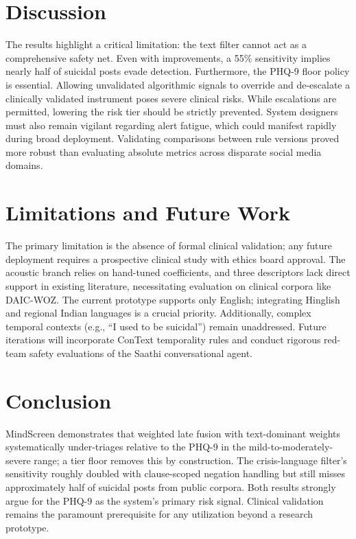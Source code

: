 \documentclass[conference]{IEEEtran}
\begin{document}
\section{Discussion}
The results highlight a critical limitation: the text filter cannot act as a comprehensive safety net. Even with improvements, a 55\% sensitivity implies nearly half of suicidal posts evade detection. Furthermore, the PHQ-9 floor policy is essential. Allowing unvalidated algorithmic signals to override and de-escalate a clinically validated instrument poses severe clinical risks. While escalations are permitted, lowering the risk tier should be strictly prevented. System designers must also remain vigilant regarding alert fatigue, which could manifest rapidly during broad deployment. Validating comparisons between rule versions proved more robust than evaluating absolute metrics across disparate social media domains.

\section{Limitations and Future Work}
The primary limitation is the absence of formal clinical validation; any future deployment requires a prospective clinical study with ethics board approval. The acoustic branch relies on hand-tuned coefficients, and three descriptors lack direct support in existing literature, necessitating evaluation on clinical corpora like DAIC-WOZ. The current prototype supports only English; integrating Hinglish and regional Indian languages is a crucial priority. Additionally, complex temporal contexts (e.g., ``I used to be suicidal'') remain unaddressed. Future iterations will incorporate ConText temporality rules and conduct rigorous red-team safety evaluations of the Saathi conversational agent.

\section{Conclusion}
MindScreen demonstrates that weighted late fusion with text-dominant weights systematically under-triages relative to the PHQ-9 in the mild-to-moderately-severe range; a tier floor removes this by construction. The crisis-language filter's sensitivity roughly doubled with clause-scoped negation handling but still misses approximately half of suicidal posts from public corpora. Both results strongly argue for the PHQ-9 as the system's primary risk signal. Clinical validation remains the paramount prerequisite for any utilization beyond a research prototype.
\end{document}
